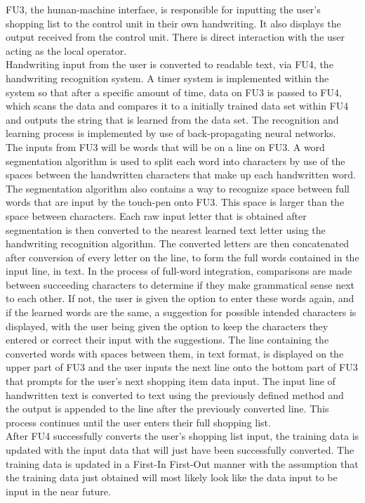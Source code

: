 {FU3, the human-machine interface, is responsible for inputting the user's shopping list to the control unit in their own handwriting. It also displays the output received from the control unit. There is direct interaction with the user acting as the local operator.\\
Handwriting input from the user is converted to readable text, via FU4, the handwriting recognition system. A timer system is implemented within the system so that after a specific amount of time, data on FU3 is passed to FU4, which scans the data and compares it to a initially trained data set within FU4 and outputs the string that is learned from the data set. The recognition and learning process is implemented by use of back-propagating neural networks.\\
The inputs from FU3 will be words that will be on a line on FU3. A word segmentation algorithm is used to split each word into characters by use of the spaces between the handwritten characters that make up each handwritten word. The segmentation algorithm also contains a way to recognize space between full words that are input by the touch-pen onto FU3. This space is larger than the space between characters. Each raw input letter that is obtained after segmentation is then converted to the nearest learned text letter using the handwriting recognition algorithm. The converted letters are then concatenated after conversion of every letter on the line, to form the full words contained in the input line, in text. In the process of full-word integration, comparisons are made between succeeding characters to determine if they make grammatical sense next to each other. If not, the user is given the option to enter these words again, and if the learned words are the same, a suggestion for possible intended characters is displayed, with the user being given the option to keep the characters they entered or correct their input with the suggestions. The line containing the converted words with spaces between them, in text format, is displayed on the upper part of FU3 and the user inputs the next line onto the bottom part of FU3 that prompts for the user's next shopping item data input. The input line of handwritten text is converted to text using the previously defined method and the output is appended to the line after the previously converted line. This process continues until the user enters their full shopping list. \\
After FU4 successfully converts the user's shopping list input, the training data is updated with the input data that will just have been successfully converted. The training data is updated in a First-In First-Out manner with the assumption that the training data just obtained will most likely look like the data input to be input in the near future.  
}
